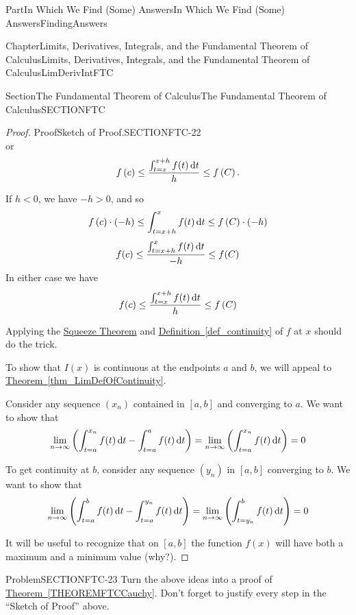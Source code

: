 \documentclass[oneside,10pt,]{book}
\newcommand{\xreffont}{\relax}
\numberwithin{equation}{part}
\newcommand{\dx}[1]{\,{\rm d}#1}
\def\limit#1#2#3{{\displaystyle\lim_{#1\rightarrow #2}#3}}
\newcommand{\lt}{<}
\begin{document}
\begin{partptx}{Part}{In Which We Find (Some) Answers}{}{In Which We Find (Some) Answers}{}{}{FindingAnswers}
\begin{chapterptx}{Chapter}{Limits, Derivatives, Integrals, and the Fundamental Theorem of Calculus}{}{Limits, Derivatives, Integrals, and the Fundamental Theorem of Calculus}{}{}{LimDerivIntFTC}
\begin{sectionptx}{Section}{The Fundamental Theorem of Calculus}{}{The Fundamental Theorem of Calculus}{}{}{SECTIONFTC}
\begin{proof}{Proof}{Sketch of Proof.}{SECTIONFTC-22}
\begin{equation*}
\end{equation*}
or%
\begin{equation*}
f\left(c\right)\le \frac{\int^{x+h}_{t=x}{f(t)\dx{t}}}{h}\le
f\left(C\right)\text{.}
\end{equation*}
%
\par
If \(h\lt 0\), we have \(-h>0\), and so%
\begin{equation*}
f\left(c\right)\cdot \left(-h\right)\le
\int^x_{t=x+h}{f(t)\dx{t}}\le f\left(C\right)\cdot (-h)
\end{equation*}
%
\begin{equation*}
f(c)\le \frac{\int^x_{t=x+h}{f(t)\dx{t}}}{-h}\le f(C)
\end{equation*}
In either case we have%
\begin{equation*}
f(c)\le \frac{\int^{x+h}_{t=x}{f(t)\dx{t}}}{h}\le f\left(C\right)
\end{equation*}
%
\par
Applying the \hyperref[thm_SqueezeTheoremFunctions]{Squeeze Theorem} and \hyperref[def_continuity]{Definition~{\xreffont\ref{def_continuity}}} of \(f\) at \(x\) should do the trick.%
\par
To show that \(I(x)\) is  continuous  at the endpoints \(a\) and \(b\), we will appeal to \hyperref[thm_LimDefOfContinuity]{Theorem~{\xreffont\ref{thm_LimDefOfContinuity}}}.%
\par
Consider any sequence \((x_n)\) contained in \([a,b]\) and converging to \(a\). We want to show that%
\begin{equation*}
\limit{n}{\infty }{\left(\int^{x_n}_{t=a}{f(t)\dx{t}}-\int^a_{t=a}{f(t)\dx{t}}\right)}
=\limit{n}{\infty }{
\left(\int^{x_n}_{t=a}{f(t)\dx{t}}\right)}=0 
\end{equation*}
%
\par
To get continuity at \(b\), consider any sequence \(\left(y_n\right)\) in \([a,b]\) converging to \(b\).  We want to show that%
\begin{equation*}
\limit{n}{ \infty }
{\left(\int^b_{t=a}{f(t)\dx{t}}-\int^{y_n}_{t=a}{f(t)\dx{t}}\right)
}=\limit{n}{\infty } {\left(\int^b_{t=y_n}{f(t)\dx{t}}\right)}=0
\end{equation*}
%
\par
It will be useful to recognize that on \([a,b]\) the function \(f(x)\) will have both a maximum and a minimum value (why?).%
\end{proof}
\begin{problem}{Problem}{}{SECTIONFTC-23}%
Turn the above ideas into a proof of \hyperref[THEOREMFTCCauchy]{Theorem~{\xreffont\ref{THEOREMFTCCauchy}}}. Don't forget to justify every step in the ``Sketch of Proof'' above.%

\end{problem}
\end{sectionptx}
\end{chapterptx}
\end{partptx}
\end{document}
